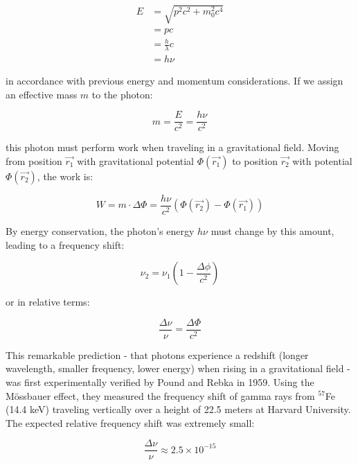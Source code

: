 \documentclass[
  a4paper,
]{book}
\begin{document}
\[
\begin{aligned}
E & =  \sqrt{p^2c^2 + m_0^2 c^4}\\
{} & =  p c\\
{} & =  \frac{h}{\lambda} c\\
{} & =  h \nu
\end{aligned}
\]

in accordance with previous energy and momentum considerations. If we
assign an effective mass \(m\) to the photon:

\[
m = \frac{E}{c^2} = \frac{h \nu}{c^2}
\]

this photon must perform work when traveling in a gravitational field.
Moving from position \(\vec{r_1}\) with gravitational potential
\(\Phi(\vec{r_1})\) to position \(\vec{r_2}\) with potential
\(\Phi(\vec{r_2})\), the work is:

\[
W = m \cdot \Delta \Phi = \frac{h \nu}{c^2} \left( \Phi \left( \vec{r_2} \right) - \Phi \left( \vec{r_1} \right) \right)
\]

By energy conservation, the photon's energy \(h\nu\) must change by this
amount, leading to a frequency shift:

\[
\nu_2 = \nu_1 \left(1-\frac{\Delta \phi}{c^2} \right)
\]

or in relative terms:

\[
\frac{\Delta \nu}{\nu} = \frac{\Delta \Phi}{c^2}
\]

This remarkable prediction - that photons experience a redshift (longer
wavelength, smaller frequency, lower energy) when rising in a
gravitational field - was first experimentally verified by Pound and
Rebka in 1959. Using the Mössbauer effect, they measured the frequency
shift of gamma rays from \(^{57}\)Fe (14.4 keV) traveling vertically
over a height of 22.5 meters at Harvard University. The expected
relative frequency shift was extremely small:

\[
\frac{\Delta \nu}{\nu} \approx 2.5 \times 10^{-15}
\]
\end{document}
